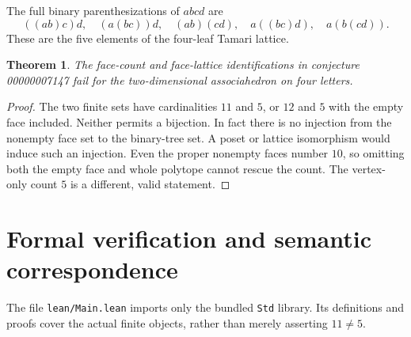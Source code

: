 \documentclass[10pt]{article}
\newtheorem{theorem}{Theorem}
\begin{document}
The full binary parenthesizations of $abcd$ are
\[
((ab)c)d,\quad (a(bc))d,\quad (ab)(cd),\quad
 a((bc)d),\quad a(b(cd)).
\]
These are the five elements of the four-leaf Tamari lattice.

\begin{theorem}
The face-count and face-lattice identifications in conjecture 00000007147 fail for the two-dimensional associahedron on four letters.
\end{theorem}
\begin{proof}
The two finite sets have cardinalities $11$ and $5$, or $12$ and $5$ with the empty face included. Neither permits a bijection. In fact there is no injection from the nonempty face set to the binary-tree set. A poset or lattice isomorphism would induce such an injection. Even the proper nonempty faces number $10$, so omitting both the empty face and whole polytope cannot rescue the count. The vertex-only count $5$ is a different, valid statement.
\end{proof}

\newpage
\section{Formal verification and semantic correspondence}
The file \texttt{lean/Main.lean} imports only the bundled \texttt{Std} library. Its definitions and proofs cover the actual finite objects, rather than merely asserting $11\ne5$.
\end{document}
